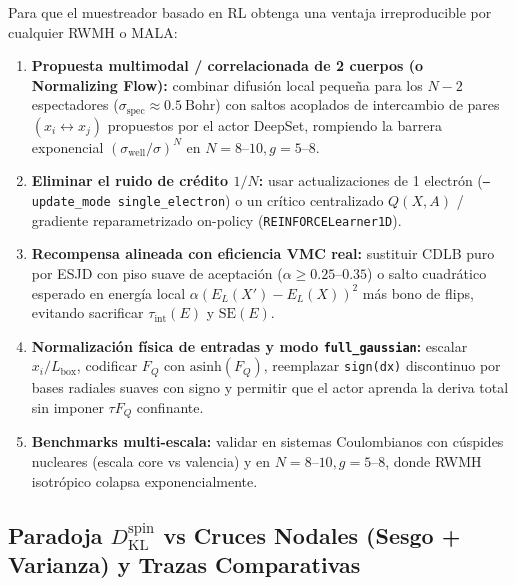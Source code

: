 \documentclass[10pt,a4paper]{article}
\begin{document}
Para que el muestreador basado en RL obtenga una ventaja irreproducible por cualquier RWMH o MALA:
\begin{enumerate}
\item \textbf{Propuesta multimodal / correlacionada de 2 cuerpos (o Normalizing Flow):} combinar difusión local pequeña para los $N-2$ espectadores ($\sigma_{\mathrm{spec}}\approx 0.5\ \mathrm{Bohr}$) con saltos acoplados de intercambio de pares $(x_i \leftrightarrow x_j)$ propuestos por el actor DeepSet, rompiendo la barrera exponencial $(\sigma_{\mathrm{well}}/\sigma)^N$ en $N=8\text{–}10, g=5\text{–}8$.
\item \textbf{Eliminar el ruido de crédito $1/N$:} usar actualizaciones de 1 electrón (\texttt{--update\_mode single\_electron}) o un crítico centralizado $Q(X,A)$ / gradiente reparametrizado on-policy (\texttt{REINFORCELearner1D}).
\item \textbf{Recompensa alineada con eficiencia VMC real:} sustituir CDLB puro por ESJD con piso suave de aceptación ($\alpha \ge 0.25\text{–}0.35$) o salto cuadrático esperado en energía local $\alpha(E_L(X')-E_L(X))^2$ más bono de flips, evitando sacrificar $\tau_{\mathrm{int}}(E)$ y $\mathrm{SE}(E)$.
\item \textbf{Normalización física de entradas y modo \texttt{full\_gaussian}:} escalar $x_i / L_{\mathrm{box}}$, codificar $F_Q$ con $\mathrm{asinh}(F_Q)$, reemplazar \texttt{sign(dx)} discontinuo por bases radiales suaves con signo y permitir que el actor aprenda la deriva total sin imponer $\tau F_Q$ confinante.
\item \textbf{Benchmarks multi-escala:} validar en sistemas Coulombianos con cúspides nucleares (escala core vs valencia) y en $N=8\text{–}10, g=5\text{–}8$, donde RWMH isotrópico colapsa exponencialmente.
\end{enumerate}

\subsection{Paradoja $D_{\mathrm{KL}}^{\mathrm{spin}}$ vs Cruces Nodales (Sesgo + Varianza) y Trazas Comparativas}
\end{document}
